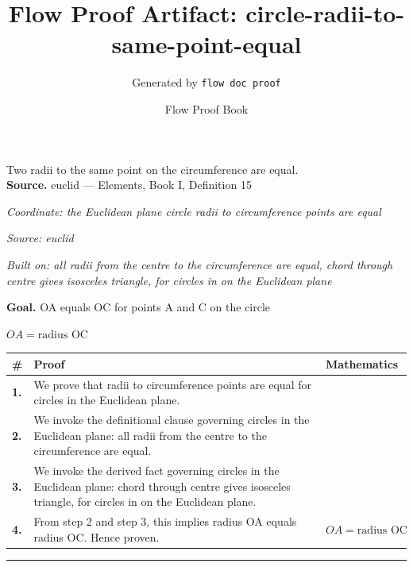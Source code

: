 \documentclass[11pt]{article}
\title{Flow Proof Artifact: circle-radii-to-same-point-equal}
\author{Generated by \texttt{flow doc proof}}
\date{Flow Proof Book}
\theoremstyle{definition}
\begin{document}
\maketitle
Two radii to the same point on the circumference are equal.\\[0.5em]
\textbf{Source.} euclid — Elements, Book I, Definition 15\\[0.5em]
\bigskip
{}\par
\smallskip\noindent\textit{Coordinate: the Euclidean plane \cdot circle \cdot radii to circumference points are equal}\par
\smallskip\noindent\textit{Source: euclid}\par
\smallskip\noindent\textit{Built on: all radii from the centre to the circumference are equal, chord through centre gives isosceles triangle, for circles in on the Euclidean plane}\par
\medskip
\noindent\textbf{Goal.} OA equals OC for points A and C on the circle\par
\noindent$\displaystyle OA = \text{radius OC}$\par
\medskip
\noindent
\begin{tabular}{@{} >{\raggedright\arraybackslash}p{} >{\raggedright\arraybackslash}p{} >{\raggedleft\arraybackslash}p{} @{}}
\textbf{\#} & \textbf{Proof} & \textbf{Mathematics} \\
\midrule
\textbf{1.} & We prove that radii to circumference points are equal for circles in the Euclidean plane. & \\[0.45em]
\textbf{2.} & We invoke the definitional clause governing circles in the Euclidean plane: all radii from the centre to the circumference are equal. & \\[0.45em]
\textbf{3.} & We invoke the derived fact governing circles in the Euclidean plane: chord through centre gives isosceles triangle, for circles in on the Euclidean plane. & \\[0.45em]
\textbf{4.} & From step 2 and step 3, this implies radius OA equals radius OC. Hence proven. & $\displaystyle OA = \text{radius OC}$ \\[0.45em]
\bottomrule
\end{tabular}
\label{thm:Geometry-circle-radii_to_circumference_points_are_equal}
\par\medskip\hrule
\end{document}
